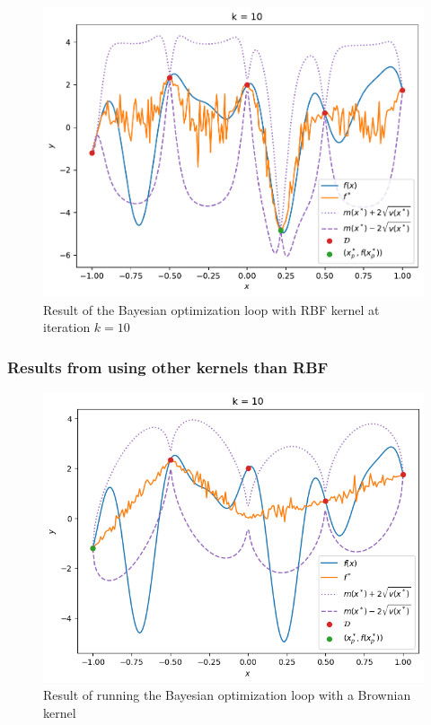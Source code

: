 \begin{figure}%
    \includegraphics[width=\textwidth]{figures/gp/b2-k_10.pdf}
    \caption{Result of the Bayesian optimization loop with RBF kernel at iteration $k = 10$}
\end{figure}
\subsubsection{Results from using other kernels than RBF}
\begin{figure}%
    \includegraphics[width=\textwidth]{figures/gp/Brownian.png}
    \caption{Result of running the Bayesian optimization loop with a Brownian kernel}
\end{figure}

